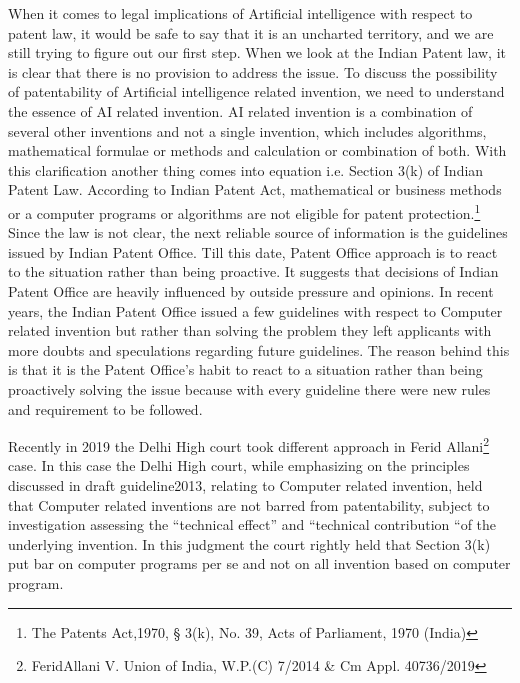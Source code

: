 \begin{multicols}{2}

\vspace{.1cm}

\noi
When it comes to legal implications of Artificial intelligence with respect to patent law, it
would be safe to say that it is an uncharted territory, and we are still trying to figure out our
first step. When we look at the Indian Patent law, it is clear that there is no provision to
address the issue. To discuss the possibility of patentability of Artificial intelligence related
invention, we need to understand the essence of AI related invention. AI related invention is
a combination of several other inventions and not a single invention, which includes
algorithms, mathematical formulae or methods and calculation or combination of both. With
this clarification another thing comes into equation i.e. Section 3(k) of Indian Patent Law.
According to Indian Patent Act, mathematical or business methods or a computer programs
or algorithms are not eligible for patent protection.\footnote{The Patents Act,1970, § 3(k), No. 39, Acts of Parliament, 1970 (India)}
Since the law is not clear, the next
reliable source of information is the guidelines issued by Indian Patent Office. Till this date,
Patent Office approach is to react to the situation rather than being proactive. It suggests that
decisions of Indian Patent Office are heavily influenced by outside pressure and opinions. In recent years, the Indian Patent Office issued a few guidelines with respect to Computer
related invention but rather than solving the problem they left applicants with more doubts
and speculations regarding future guidelines. The reason behind this is that it is the Patent
Office’s habit to react to a situation rather than being proactively solving the issue because
with every guideline there were new rules and requirement to be followed. 

\noi
Recently in 2019 the Delhi High court took different approach in Ferid Allani\footnote{FeridAllani V. Union of India, W.P.(C) 7/2014 \& Cm Appl. 40736/2019}
 case. In this
case the Delhi High court, while emphasizing on the principles discussed in draft guideline2013, relating to Computer related invention, held that Computer related inventions are not
barred from patentability, subject to investigation assessing the “technical effect” and
“technical contribution “of the underlying invention. In this judgment the court rightly held
that Section 3(k) put bar on computer programs per se and not on all invention based on
computer program. 


\end{multicols}
